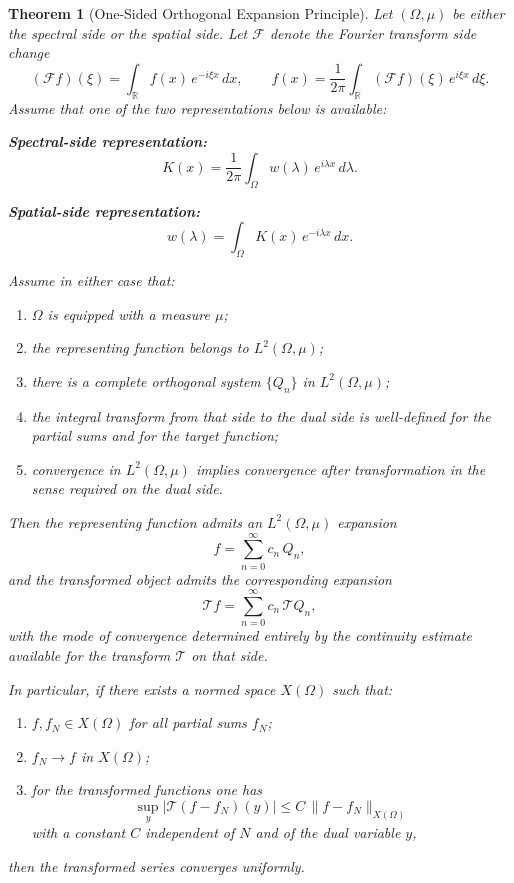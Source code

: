 \documentclass[12pt]{article}
\newtheorem{theorem}{Theorem}
\begin{document}
\begin{theorem}[One-Sided Orthogonal Expansion Principle]
Let $(\Omega,\mu)$ be either the spectral side or the spatial side. Let $\mathcal{F}$ denote the Fourier transform side change
\[
    (\mathcal{F}f)(\xi)=\int_{\mathbb{R}} f(x)\,e^{-i\xi x}\,dx,
    \qquad
    f(x)=\frac{1}{2\pi}\int_{\mathbb{R}} (\mathcal{F}f)(\xi)\,e^{i\xi x}\,d\xi .
\]
Assume that one of the two representations below is available:

\medskip

\noindent
\textbf{Spectral-side representation:}
\[
    K(x)=\frac{1}{2\pi}\int_{\Omega} w(\lambda)\,e^{i\lambda x}\,d\lambda .
\]

\noindent
\textbf{Spatial-side representation:}
\[
    w(\lambda)=\int_{\Omega} K(x)\,e^{-i\lambda x}\,dx .
\]

Assume in either case that:
\begin{enumerate}
    \item $\Omega$ is equipped with a measure $\mu$;
    \item the representing function belongs to $L^2(\Omega,\mu)$;
    \item there is a complete orthogonal system $\{Q_n\}$ in $L^2(\Omega,\mu)$;
    \item the integral transform from that side to the dual side is well-defined for the partial sums and for the target function;
    \item convergence in $L^2(\Omega,\mu)$ implies convergence after transformation in the sense required on the dual side.
\end{enumerate}

Then the representing function admits an $L^2(\Omega,\mu)$ expansion
\[
    f=\sum_{n=0}^\infty c_n\,Q_n,
\]
and the transformed object admits the corresponding expansion
\[
    \mathcal{T}f=\sum_{n=0}^\infty c_n\,\mathcal{T}Q_n,
\]
with the mode of convergence determined entirely by the continuity estimate available for the transform $\mathcal{T}$ on that side.

In particular, if there exists a normed space $X(\Omega)$ such that:
\begin{enumerate}
    \item $f,f_N \in X(\Omega)$ for all partial sums $f_N$;
    \item $f_N \to f$ in $X(\Omega)$;
    \item for the transformed functions one has
    \[
        \sup_{y} |\mathcal{T}(f-f_N)(y)| \le C\,\|f-f_N\|_{X(\Omega)}
    \]
    with a constant $C$ independent of $N$ and of the dual variable $y$,
\end{enumerate}
then the transformed series converges uniformly.
\end{theorem}
\end{document}
